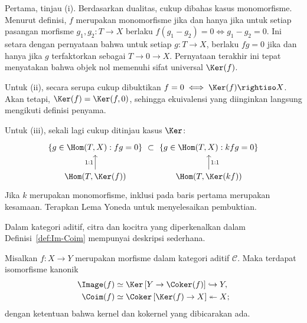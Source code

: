 \begin{bukti}
	Pertama, tinjau (i). Berdasarkan dualitas, cukup dibahas kasus
	monomorfisme. Menurut definisi, $f$ merupakan monomorfisme jika dan hanya
	jika untuk setiap pasangan morfisme $g_1,g_2: T \to X$ berlaku
	$f(g_1-g_2)=0 \iff g_1-g_2=0$. Ini setara dengan pernyataan bahwa untuk
	setiap $g: T \to X$, berlaku $fg=0$ jika dan hanya jika $g$ terfaktorkan
	sebagai $T \to 0 \to X$. Pernyataan terakhir ini tepat menyatakan bahwa
	objek nol memenuhi sifat universal $\Ker(f)$.

	Untuk (ii), secara serupa cukup dibuktikan
	$f=0 \iff \Ker(f) \rightiso X$. Akan tetapi,
	$\Ker(f)=\Ker(f,0)$, sehingga ekuivalensi yang diinginkan langsung
	mengikuti definisi penyama.

	Untuk (iii), sekali lagi cukup ditinjau kasus $\Ker$:
	\[\begin{tikzcd}[column sep=small]
		\left\{ g \in \Hom(T, X): fg=0 \right\} \arrow[phantom, r, "\subset" description] & \left\{ g \in \Hom(T, X): kfg=0 \right\} \\
		\Hom(T, \Ker(f)) \arrow[u, "1:1"] & \Hom(T, \Ker(kf)) \arrow[u, "1:1"']
	\end{tikzcd}\]
	Jika $k$ merupakan monomorfisme, inklusi pada baris pertama merupakan
	kesamaan. Terapkan Lema Yoneda untuk menyelesaikan pembuktian.
\end{bukti}

Dalam kategori aditif, citra dan kocitra yang diperkenalkan dalam
Definisi~\ref{def:Im-Coim} mempunyai deskripsi sederhana.

\begin{proposisi}\label{prop:Im-Coim-additive}
	Misalkan $f: X \to Y$ merupakan morfisme dalam kategori aditif
	$\mathcal{C}$. Maka terdapat isomorfisme kanonik
	\begin{align*}
		\Image(f) & \simeq \Ker\left[ Y \to \Coker(f) \right] \hookrightarrow Y, \\
		\Coim(f) & \simeq \Coker\left[ \Ker(f) \to X \right] \twoheadleftarrow X ;
	\end{align*}
	dengan ketentuan bahwa kernel dan kokernel yang dibicarakan ada.
\end{proposisi}

